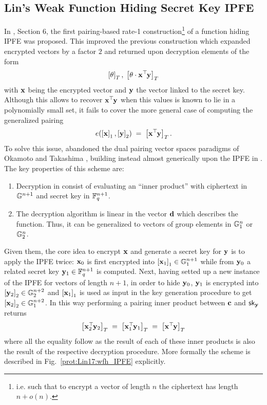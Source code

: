 
\newcommand{\IPsetup}{\cd{IP.Setup}}
\newcommand{\IPenc}{\cd{IP.Enc}}
\newcommand{\IPkeygen}{\cd{IP.KeyGen}}
\newcommand{\IPdec}{\cd{IP.Dec}}



\subsection{Lin's Weak Function Hiding Secret Key IPFE}
In \cite{C:Lin17}, Section 6, the first pairing-based rate-1 construction\footnote{i.e. such that to encrypt a vector of length $n$ the ciphertext has length $n + o(n)$.} of a function hiding IPFE was proposed.
This improved the previous construction \cite{AC:BisJaiKow15} which expanded encrypted vectors by a factor $2$ and returned upon decryption elements of the form
\[
	\gexp{T}{\theta}
		, \;
	\gexp{T}{\theta \cdot \vc{x}^\trs \vc{y}}
\]
with $\vc{x}$ being the encrypted vector and $\vc{y}$ the vector linked to the secret key.
Although this allows to recover $\vc{x}^\trs \vc{y}$ when this values is known to lie in a polynomially small set, it fails to cover the more general case of computing the generalized pairing
\[
	e(\gexp{1}{\vc{x}}, \gexp{2}{\vc{y}})
		\; = \;
	\gexp{T}{\vc{x}^\trs \vc{y}}.
\]
%
To solve this issue, \cite{C:Lin17} abandoned the dual pairing vector spaces paradigms of Okamoto and Takashima \cite{PAIRING:OkaTak08, AC:OkaTak09}, building instead almost generically upon the IPFE in \cite{PKC:ABDP15}.
The key properties of this scheme are:
\begin{enumerate}
	\item Decryption in \cite{PKC:ABDP15} consist of evaluating an ``inner product'' with ciphertext in $\G^{n+1}$ and secret key in $\F_q^{n+1}$.
	
	\item The decryption algorithm is linear in the vector $\vc{d}$ which describes the function.
	Thus, it can be generalized to vectors of group elements in $\G_1^n$ or $\G_2^n$.
\end{enumerate}
Given them, the core idea to encrypt $\vc{x}$ and generate a secret key for $\vc{y}$ is to apply the IPFE twice: 
$\vc{x}_0$ is first encrypted into $\gexp{1}{\vc{x}_1} \in \G_1^{n+1}$ while from $\vc{y}_0$ a related secret key $\vc{y}_1 \in \F_q^{n+1}$ is computed.
Next, having setted up a new instance of the IPFE for vectors of length $n+1$, in order to hide $\vc{y}_0$, $\vc{y}_1$ is encrypted into $\gexp{2}{\vc{y}_2} \in \G_2^{n+2}$ and $\gexp{1}{\vc{x}_1}$ is used as input in the key generation procedure to get $\gexp{2}{\vc{x}_2} \in \G_1^{n+2}$.
In this way performing a pairing inner product between $\vc{c}$ and $\sk_\vc{y}$ returns
\[
	\gexp{T}{\vc{x}_2^\trs \vc{y}_2}
		\; = \;
	\gexp{T}{\vc{x}_1^\trs \vc{y}_1}
		\; = \;
	\gexp{T}{\vc{x}^\trs \vc{y}}
\]
where all the equality follow as the result of each of these inner products is also the result of the respective decryption procedure.
More formally the scheme is described in Fig.~\ref{prot:Lin17:wfh_IPFE} explicitly.

